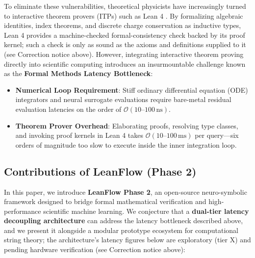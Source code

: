 \documentclass[11pt,a4paper]{article}
\begin{document}
To eliminate these vulnerabilities, theoretical physicists have increasingly turned to interactive theorem provers (ITPs) such as Lean 4 \cite{de2015lean,moura2021lean}. By formalizing algebraic identities, index theorems, and discrete charge conservation as inductive types, Lean 4 provides a machine-checked formal-consistency check backed by its proof kernel; such a check is only as sound as the axioms and definitions supplied to it (see Correction notice above). However, integrating interactive theorem proving directly into scientific computing introduces an insurmountable challenge known as the \textbf{Formal Methods Latency Bottleneck}:
\begin{itemize}
    \item \textbf{Numerical Loop Requirement}: Stiff ordinary differential equation (ODE) integrators and neural surrogate evaluations require bare-metal residual evaluation latencies on the order of $\mathcal{O}(10\text{--}100\,\text{ns})$.
    \item \textbf{Theorem Prover Overhead}: Elaborating proofs, resolving type classes, and invoking proof kernels in Lean 4 takes $\mathcal{O}(10\text{--}100\,\text{ms})$ per query---six orders of magnitude too slow to execute inside the inner integration loop.
\end{itemize}

\subsection{Contributions of LeanFlow (Phase 2)}
In this paper, we introduce \textbf{LeanFlow Phase 2}, an open-source neuro-symbolic framework designed to bridge formal mathematical verification and high-performance scientific machine learning. We conjecture that a \textbf{dual-tier latency decoupling architecture} can address the latency bottleneck described above, and we present it alongside a modular prototype ecosystem for computational string theory; the architecture's latency figures below are exploratory (tier X) and pending hardware verification (see Correction notice above):
\end{document}

